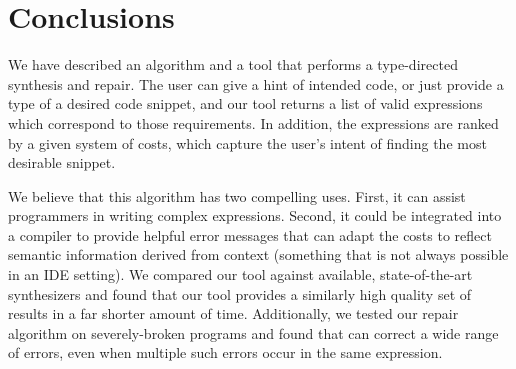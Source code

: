 \section{Conclusions}
\label{sec:conclusions}
We have described an algorithm and a tool that performs a type-directed synthesis and repair. The user can give a hint of intended code, or just provide a type of a desired code snippet, and our tool returns a list of valid expressions which correspond to those requirements. In addition, the expressions are ranked by a given system of costs, which capture the user's intent of finding the most desirable snippet.

We believe that this algorithm has two compelling uses. First, it can assist programmers in writing complex expressions. Second, it could be integrated into a compiler to provide helpful error messages that can adapt the costs to reflect semantic information derived from context (something that is not always possible in an IDE setting). We compared our tool against available, state-of-the-art synthesizers and found that our tool provides a similarly high quality set of results in a far shorter amount of time. Additionally, we tested our repair algorithm on severely-broken programs and found that \ourTool can correct a wide range of errors, even when multiple such errors occur in the same expression.